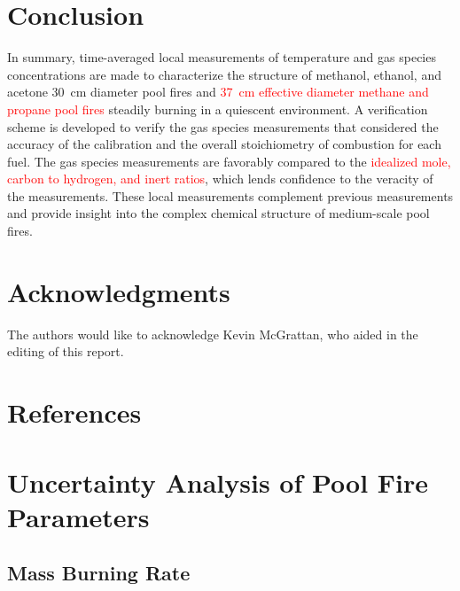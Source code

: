 \documentclass[12pt]{article}
\begin{document}
\section{Conclusion}
\label{sec:Conclusion}
In summary, time-averaged local measurements of temperature and gas species concentrations are made to characterize the structure of methanol, ethanol, and acetone 30~cm diameter pool fires and \textcolor{red}{37~cm effective diameter methane and propane pool fires} steadily burning in a quiescent environment. A verification scheme is developed to verify the gas species measurements that considered  the accuracy of the calibration and the overall stoichiometry of combustion for each fuel. The gas species measurements are favorably compared to the \textcolor{red}{idealized mole, carbon to hydrogen, and inert ratios}, which lends confidence to the veracity of the measurements. These local measurements complement previous measurements and provide insight into the complex chemical structure of medium-scale pool fires.

\section*{Acknowledgments}
The authors would like to acknowledge Kevin McGrattan, who aided in the editing of this report.

\clearpage

\section*{References}




\clearpage


\appendix
{}
\makeatletter
\newcommand{\section@cntformat}{Appendix:\ }
\makeatother

\section{Uncertainty Analysis of Pool Fire Parameters}\label{sec:Uncertainty_Pool_Fire_Parameters}

\subsection{Mass Burning Rate}
\label{ssec:Mass_Burning_Flux}
\end{document}

